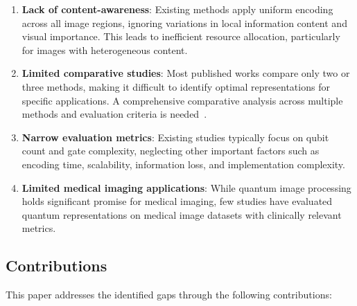 \documentclass{ipol}
\begin{document}
\begin{enumerate}
\item \textbf{Lack of content-awareness}: Existing methods apply uniform encoding across all image regions, ignoring variations in local information content and visual importance. This leads to inefficient resource allocation, particularly for images with heterogeneous content.

\item \textbf{Limited comparative studies}: Most published works compare only two or three methods, making it difficult to identify optimal representations for specific applications. A comprehensive comparative analysis across multiple methods and evaluation criteria is needed~\cite{bib42}.

\item \textbf{Narrow evaluation metrics}: Existing studies typically focus on qubit count and gate complexity, neglecting other important factors such as encoding time, scalability, information loss, and implementation complexity.

\item \textbf{Limited medical imaging applications}: While quantum image processing holds significant promise for medical imaging, few studies have evaluated quantum representations on medical image datasets with clinically relevant metrics.
\end{enumerate}

\subsection{Contributions}

This paper addresses the identified gaps through the following contributions:
\end{document}

